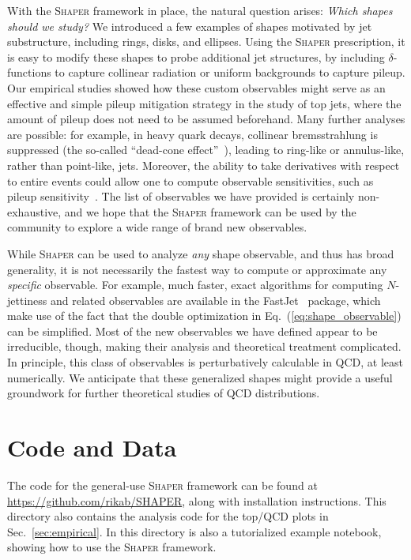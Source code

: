 \documentclass[letterpaper,11pt]{article}
\DeclareRobustCommand{\Sec}[1]{Sec.~\ref{sec:#1}}
\DeclareRobustCommand{\Eq}[1]{Eq.~(\ref{eq:#1})}
\newcommand{\FastJet}{{\sc FastJet}\xspace}
\newcommand{\Shaper}{\textsc{Shaper}\xspace}
\begin{document}
With the \Shaper framework in place, the natural question arises: \emph{Which shapes should we study?} We introduced a few examples of shapes motivated by jet substructure, including rings, disks, and ellipses. Using the \Shaper prescription, it is easy to modify these shapes to probe additional jet structures, by including $\delta$-functions to capture collinear radiation or uniform backgrounds to capture pileup. Our empirical studies showed how these custom observables might serve as an effective and simple pileup mitigation strategy in the study of top jets, where the amount of pileup does not need to be assumed beforehand. Many further analyses are possible: for example, in heavy quark decays, collinear bremsstrahlung is suppressed (the so-called ``dead-cone effect''~\cite{Dokshitzer:1991fc, Dokshitzer:1991fd, PhysRevLett.69.3025}), leading to ring-like or annulus-like, rather than point-like, jets. Moreover, the ability to take derivatives with respect to entire events could allow one to compute observable sensitivities, such as pileup sensitivity~\cite{Soyez:2012hv}.
The list of observables we have provided is certainly non-exhaustive, and we hope that the \Shaper framework can be used by the community to explore a wide range of brand new observables.

While \Shaper can be used to analyze \emph{any} shape observable, and thus has broad generality, it is not necessarily the fastest way to compute or approximate any \emph{specific} observable. For example, much faster, exact algorithms for computing $N$-jettiness and related observables are available in the \FastJet~\cite{Cacciari:2011ma} package, which make use of the fact that the double optimization in \Eq{shape_observable} can be simplified. Most of the new observables we have defined appear to be irreducible, though, making their analysis and theoretical treatment complicated. In principle, this class of observables is perturbatively calculable in QCD, at least numerically.
%
We anticipate that these generalized shapes might provide a useful groundwork for further theoretical studies of QCD distributions.



\section*{Code and Data}

The code for the general-use \Shaper framework can be found at \url{https://github.com/rikab/SHAPER}, along with installation instructions.
%
This directory also contains the analysis code for the top/QCD plots in \Sec{empirical}. 
%
In this directory is also a tutorialized example notebook, showing how to use the \Shaper framework.
\end{document}
